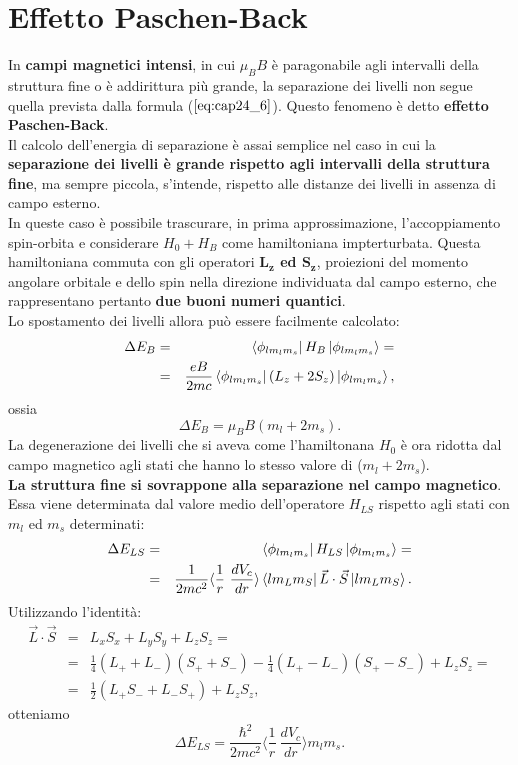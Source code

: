 \documentclass[a4paper,12pt,oneside]{book}
\begin{document}
\section{Effetto Paschen-Back}
In \textbf{campi magnetici intensi}, in cui $\mu_B B$ è paragonabile agli intervalli della struttura fine o è addirittura più grande, la separazione dei livelli non segue quella prevista dalla formula ($\ref{eq:cap24_6}$). Questo fenomeno è detto \textbf{effetto Paschen-Back}. \\
Il calcolo dell'energia di separazione è assai semplice nel caso in cui la \textbf{separazione dei livelli è grande rispetto agli intervalli della struttura fine}, ma sempre piccola, s'intende, rispetto alle distanze dei livelli in assenza di campo esterno. \\
In queste caso è possibile trascurare, in prima approssimazione, l'accoppiamento spin-orbita e considerare $ H_0+H_B $ come hamiltoniana impterturbata. Questa hamiltoniana commuta con gli operatori \textbf{$\boldsymbol{L_z}$ ed $\boldsymbol{S_z}$}, proiezioni del momento angolare orbitale e dello spin nella direzione individuata dal campo esterno, che rappresentano pertanto \textbf{due buoni numeri quantici}. \\
Lo spostamento dei livelli allora può essere facilmente calcolato: 
\begin{eqnarray}
\Delta E_B & = &\bra{\phi_{lm_lm_s}} H_B \ket{\phi_{lm_lm_s}}=\nonumber  \\
& =& \frac{eB}{2mc}\bra{\phi_{lm_lm_s}} \left( L_z+2S_z  \right)\ket{\phi_{lm_lm_s}} ,
\end{eqnarray}
ossia 
\begin{equation}
\Delta E_B = \mu_B B \left( m_l+2m_s\right) .
\end{equation}
La degenerazione dei livelli che si aveva come l'hamiltonana $H_0$ è ora ridotta dal campo magnetico agli stati che hanno lo stesso valore di ($m_l+2m_s$). \\
\textbf{La struttura fine si sovrappone alla separazione nel campo magnetico}. Essa viene determinata dal valore medio dell'operatore $H_{LS}$ rispetto agli stati con $m_l$ ed $m_s$ determinati:
\begin{eqnarray}
\Delta E_{LS} & =& \bra{\phi_{lm_lm_s}} H_{LS} \ket{\phi_{lm_lm_s}}= \nonumber \\
& = &\frac{1}{2mc^2} \langle \frac{1}{r} \ \frac{dV_c}{dr}   \rangle \bra{lm_Lm_S} \vec{L} \cdot \vec{S} \ket{lm_Lm_S} .
\end{eqnarray}
Utilizzando l'identità:
\begin{eqnarray}
\vec{L} \cdot \vec{S} & = & L_xS_x+L_yS_y+L_zS_z= \nonumber  \\
& = & \frac{1}{4} \left( L_{+}+L_{-} \right)  \left( S_{+}+S_{-}\right)-\frac{1}{4} \left( L_{+}-L_{-} \right) \left( S_{+}-S_{-} \right)+L_zS_z =  \nonumber \\
& = &\frac{1}{2} \left( L_{+}S_{-}+L_{-}S_{+} \right)+ L_zS_z ,
\end{eqnarray}
otteniamo
\begin{equation}
\Delta E_{LS}= \frac{\hbar^2}{2mc^2} \langle \frac{1}{r} \ \frac{dV_c}{dr}   \rangle m_lm_s .
\end{equation}
\end{document}
